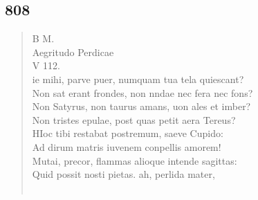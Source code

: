 \documentclass[11pt, a4paper]{report}
\begin{document}
            \subsection*{808}
      \begin{verse}
      B M. \\ Aegritudo Perdicae \\ V 112. \\ ie mihi, parve puer, numquam tua tela quiescant? \\ Non sat erant frondes, non nndae nec fera nec fons? \\ Non Satyrus, non taurus amans, uon ales et imber? \\ Non tristes epulae, post quas petit aera Tereus? \\ HIoc tibi restabat postremum, saeve Cupido: \\ Ad dirum matris iuvenem conpellis amorem! \\ Mutai, precor, flammas alioque intende sagittas: \\ Quid possit nosti pietas. ah, perlida mater, \\ 
        ﻿\pagebreak 

\end{verse}
\end{document}
